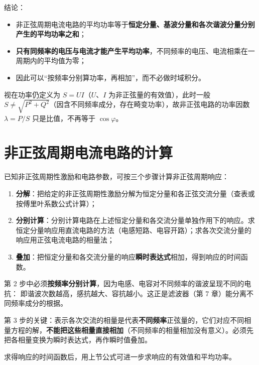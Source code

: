 结论：
\begin{itemize}
  \item 非正弦周期电流电路的平均功率等于\textbf{恒定分量、基波分量和各次谐波分量分别产生的平均功率之和}；
  \item \textbf{只有同频率的电压与电流才能产生平均功率}，不同频率的电压、电流相乘在一周期内的平均值为零；
  \item 因此可以“按频率分别算功率，再相加”，而不必做时域积分。
\end{itemize}

视在功率仍定义为 $S=UI$（$U$、$I$ 为非正弦量的有效值），此时一般 $S\neq\sqrt{P^2+Q^2}$（因含不同频率成分，存在畸变功率），故非正弦电路的功率因数 $\lambda=P/S$ 只是比值，不再等于 $\cos\varphi$。


\section{非正弦周期电流电路的计算}
已知非正弦周期性激励和电路参数，可按三个步骤计算非正弦周期响应：

\begin{enumerate}
  \item \textbf{分解}：把给定的非正弦周期性激励分解为恒定分量和各正弦交流分量（查表或按傅里叶系数公式计算）；
  \item \textbf{分别计算}：分别计算电路在上述恒定分量和各交流分量单独作用下的响应。求恒定分量响应用直流电路的方法（电感短路、电容开路）；求各次交流分量的响应用正弦电流电路的相量法；
  \item \textbf{叠加}：把恒定分量和各交流分量的响应\textbf{瞬时表达式}相加，得到响应的时间函数。
\end{enumerate}

第 2 步中必须\textbf{按频率分别计算}，因为电感、电容对不同频率的谐波呈现不同的电抗：
即谐波次数越高，感抗越大、容抗越小。这正是滤波器（第 7 章）能分离不同频率成分的根据。

第 3 步的关键：表示各次交流的相量是代表\textbf{不同频率}正弦量的，它们对应不同相量方程的解，\textbf{不能把这些相量直接相加}（不同频率的相量相加没有意义）。必须先把各相量变换为瞬时表达式，再作瞬时值叠加。

求得响应的时间函数后，用上节公式可进一步求响应的有效值和平均功率。


